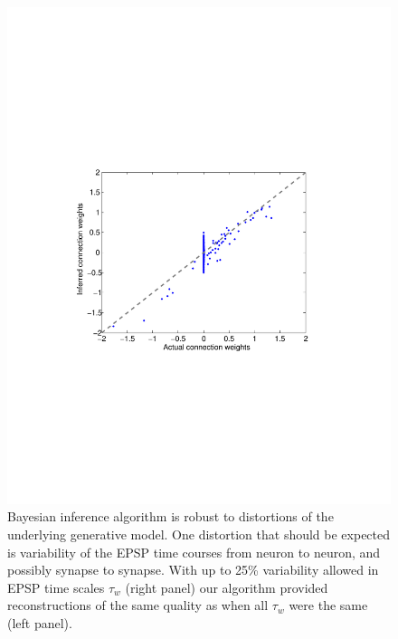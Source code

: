 \begin{figure}[h]
\begin{minipage}[c]{0.45\hsize}
\includegraphics[width=\hsize]{../figs/FigureA9_variable_25}
\end{minipage}
\caption{Bayesian inference algorithm is robust to distortions of the
underlying generative model. One distortion that should be expected is variability of the EPSP time courses from neuron to neuron, and possibly synapse to synapse. 
With up to 25\% variability allowed in EPSP time scales $\tau_w$ (right panel) our algorithm provided reconstructions of the same quality as when all $\tau_w$ were the same (left panel).}
\label{fig:vartau}
\end{figure}


